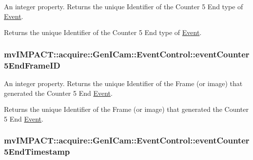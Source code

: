 An integer property. Returns the unique Identifier of the Counter 5 End type of \hyperlink{classmv_i_m_p_a_c_t_1_1acquire_1_1_event}{Event}. 

Returns the unique Identifier of the Counter 5 End type of \hyperlink{classmv_i_m_p_a_c_t_1_1acquire_1_1_event}{Event}. \hypertarget{classmv_i_m_p_a_c_t_1_1acquire_1_1_gen_i_cam_1_1_event_control_ab2c913feeb75292f2d7f5752803b8c67}{
\subsubsection[{event\+Counter5\+End\+Frame\+I\+D}]{ mv\+I\+M\+P\+A\+C\+T\+::acquire\+::\+Gen\+I\+Cam\+::\+Event\+Control\+::event\+Counter5\+End\+Frame\+I\+D}}\label{classmv_i_m_p_a_c_t_1_1acquire_1_1_gen_i_cam_1_1_event_control_ab2c913feeb75292f2d7f5752803b8c67}


An integer property. Returns the unique Identifier of the Frame (or image) that generated the Counter 5 End \hyperlink{classmv_i_m_p_a_c_t_1_1acquire_1_1_event}{Event}. 

Returns the unique Identifier of the Frame (or image) that generated the Counter 5 End \hyperlink{classmv_i_m_p_a_c_t_1_1acquire_1_1_event}{Event}. \hypertarget{classmv_i_m_p_a_c_t_1_1acquire_1_1_gen_i_cam_1_1_event_control_a7af13f09f4364840172f713326e1d78f}{
\subsubsection[{event\+Counter5\+End\+Timestamp}]{ mv\+I\+M\+P\+A\+C\+T\+::acquire\+::\+Gen\+I\+Cam\+::\+Event\+Control\+::event\+Counter5\+End\+Timestamp}}\label{classmv_i_m_p_a_c_t_1_1acquire_1_1_gen_i_cam_1_1_event_control_a7af13f09f4364840172f713326e1d78f}


